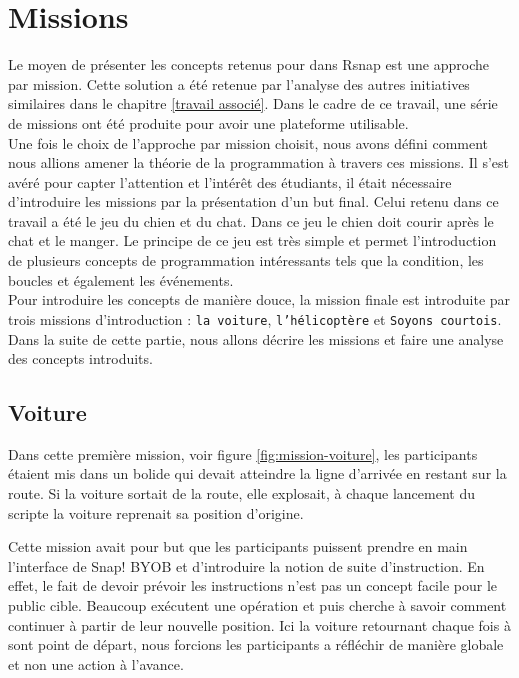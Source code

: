 \section{Missions}
\label{missions}
Le moyen de présenter les concepts retenus pour dans Rsnap est une approche par mission. Cette solution a été retenue par l'analyse des autres initiatives similaires dans le chapitre \ref{travail associé}. Dans le cadre de ce travail, une série de missions ont été produite pour avoir une plateforme utilisable.\\

Une fois le choix de l'approche par mission choisit, nous avons défini comment nous allions amener la théorie de la programmation à travers ces missions. Il s'est avéré pour capter l'attention et l'intérêt des étudiants, il était nécessaire d'introduire les missions par la présentation d'un but final. Celui retenu dans ce travail a été le jeu du chien et du chat. Dans ce jeu le chien doit courir après le chat et le manger. Le principe de ce jeu est très simple et permet l'introduction de plusieurs concepts de programmation intéressants tels que la condition, les boucles et également les événements.\\

Pour introduire les concepts de manière douce, la mission finale est introduite par trois missions d'introduction : \texttt{la voiture}, \texttt{l'hélicoptère} et \texttt{Soyons courtois}. Dans la suite de cette partie, nous allons décrire les missions et faire une analyse des concepts introduits.

\subsection{Voiture}
\label{mission-voiture}
Dans cette première mission, voir figure \ref{fig:mission-voiture}, les participants étaient mis dans un bolide qui devait atteindre la ligne d'arrivée en restant sur la route. Si la voiture sortait de la route, elle explosait, à chaque lancement du scripte la voiture reprenait sa position d'origine.

Cette mission avait pour but que les participants puissent prendre en main l'interface de Snap! BYOB et d'introduire la notion de suite d'instruction. En effet, le fait de devoir prévoir les instructions n'est pas un concept facile pour le public cible. Beaucoup exécutent une opération et puis cherche à savoir comment continuer à partir de leur nouvelle position. Ici la voiture retournant chaque fois à sont point de départ, nous forcions les participants a réfléchir de manière globale et non une action à l'avance.

